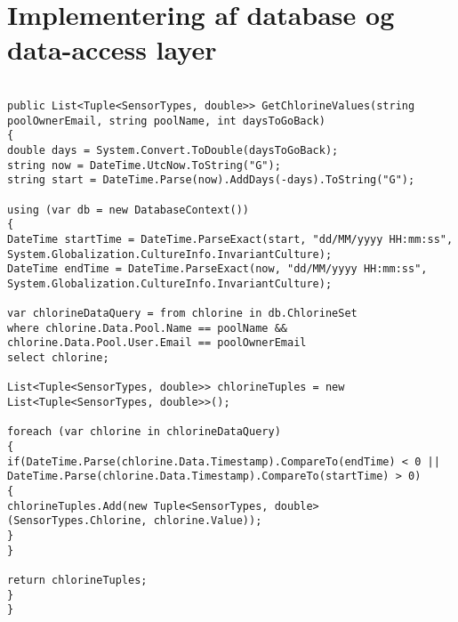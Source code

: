 \section{Implementering af database og data-access layer}


\begin{lstlisting}[caption= GetChlorineData method, label=code:getChlorineData]

public List<Tuple<SensorTypes, double>> GetChlorineValues(string poolOwnerEmail, string poolName, int daysToGoBack)
{
double days = System.Convert.ToDouble(daysToGoBack);
string now = DateTime.UtcNow.ToString("G");
string start = DateTime.Parse(now).AddDays(-days).ToString("G");

using (var db = new DatabaseContext())
{   
DateTime startTime = DateTime.ParseExact(start, "dd/MM/yyyy HH:mm:ss", System.Globalization.CultureInfo.InvariantCulture);
DateTime endTime = DateTime.ParseExact(now, "dd/MM/yyyy HH:mm:ss", System.Globalization.CultureInfo.InvariantCulture);

var chlorineDataQuery = from chlorine in db.ChlorineSet
where chlorine.Data.Pool.Name == poolName && chlorine.Data.Pool.User.Email == poolOwnerEmail
select chlorine;

List<Tuple<SensorTypes, double>> chlorineTuples = new List<Tuple<SensorTypes, double>>();

foreach (var chlorine in chlorineDataQuery)
{
if(DateTime.Parse(chlorine.Data.Timestamp).CompareTo(endTime) < 0 ||
DateTime.Parse(chlorine.Data.Timestamp).CompareTo(startTime) > 0)
{
chlorineTuples.Add(new Tuple<SensorTypes, double>(SensorTypes.Chlorine, chlorine.Value));
}
}

return chlorineTuples;
}
}
\end{lstlisting}